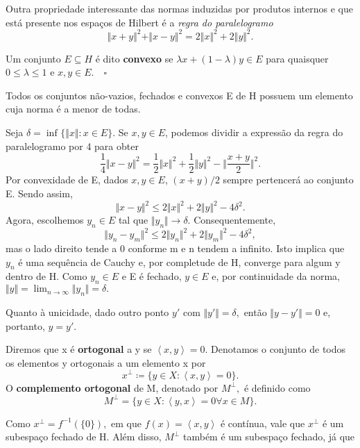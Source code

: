 \documentclass[measure_theory.tex]{subfiles}
\begin{document}
Outra propriedade interessante das normas induzidas por produtos internos e que está presente nos espaços de Hilbert é a \hypertarget{parallelogram}{\textit{regra do paralelogramo}}
\[
	\Vert x+y \Vert^{2} + \Vert x-y \Vert^{2} = 2\Vert x \Vert^{2} + 2\Vert y \Vert^{2}.
\]
\begin{def*}
	Um conjunto \(E\subseteq H\) é dito \textbf{convexo} se \(\lambda x + (1-\lambda )y\in E\) para quaisquer \(0\leq \lambda \leq 1\) e \(x, y\in E.\quad \square\)
\end{def*}
\begin{prop*}
	Todos os conjuntos não-vazios, fechados e convexos E de H possuem um elemento cuja norma é a menor de todas.
\end{prop*}
\begin{proof*}
	Seja \(\delta = \inf_{}\{\Vert x \Vert: x\in E\}\). Se \(x, y\in E\), podemos dividir a expressão da regra do paralelogramo por 4 para obter
	\[
		\frac{1}{4}\Vert x-y \Vert^{2} = \frac{1}{2}\Vert x \Vert^{2} + \frac{1}{2}\Vert y \Vert^{2} - \biggl\Vert \frac{x+y}{2}\biggr\Vert^{2}.
	\]
	Por convexidade de E, dados \(x, y \in E\), \((x+y)/2\) sempre pertencerá ao conjunto E. Sendo assim,
	\[
		\Vert x-y \Vert^{2} \leq 2\Vert x \Vert^{2} + 2\Vert y \Vert^{2} - 4\delta ^{2}.
	\]
	Agora, escolhemos \(y_{n}\in E\) tal que \(\Vert y_{n} \Vert\to \delta .\) Consequentemente,
	\[
		\Vert y_{n} - y_{m} \Vert^{2} \leq 2\Vert y_{n} \Vert^{2} + 2\Vert y_{m} \Vert^{2} - 4\delta ^{2},
	\]
	mas o lado direito tende a 0 conforme m e n tendem a infinito. Isto implica que \(y_{n}\) é uma sequência de Cauchy e, por completude de H, converge para algum y dentro de H.
	Como \(y_{n}\in E\) e E é fechado, \(y\in E\) e, por continuidade da norma, \(\Vert y \Vert = \lim_{n\to \infty}\Vert y_{n} \Vert = \delta .\)

	Quanto à unicidade, dado outro ponto \(y'\) com \(\Vert y' \Vert = \delta ,\) então \(\Vert y - y' \Vert = 0\) e, portanto, \(y = y'\). \qedsymbol
\end{proof*}
\begin{def*}
	Diremos que x é \textbf{ortogonal} a y se \(\left< x,  y \right> = 0.\) Denotamos o conjunto de todos os elementos y ortogonais a um elemento x por
	\[
		x^{\perp }\coloneqq \{y\in X: \left< x, y \right> = 0\}.
	\]
	O \textbf{complemento ortogonal} de M, denotado por \(M^{\perp },\) é definido como
	\[
		M^{\perp } =  \{y\in X: \left< y, x \right> = 0 \forall x\in M\}.
	\]
\end{def*}
Como \(x^{\perp } = f^{-1}(\{0\}),\) em que \(f(x) = \left< x, y \right>\) é contínua, vale que \(x^{\perp }\) é um subespaço fechado de H. Além disso, \(M^{\perp }\) também é um subespaço fechado, já que
\end{document}
